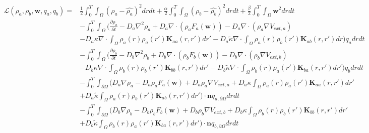 \documentclass[11pt, a4paper]{article}
\theoremstyle{definition}
\newcommand{\adja}{q_a}
\newcommand{\adjb}{q_b}
\newcommand{\adjaB}{q_{a,\partial \Omega}}
\newcommand{\adjbB}{q_{b,\partial \Omega}}
\newcommand{\ra}{\rho_a}
\newcommand{\rb}{\rho_b}
\newcommand{\w}{\mathbf{w}}
\newcommand{\n}{\mathbf{n}}
\newcommand{\K}{\mathbf{K}}
\begin{document}
	\begin{align*}
	\mathcal{L}(\ra,\rb, \w, \adja, \adjb) =& \frac{1}{2}\int_0^T \int_\Omega ( \ra - \widehat{\ra})^2 dr dt + \frac{\alpha}{2}\int_0^T \int_\Omega ( \rb - \widehat{\rb})^2 dr dt + \frac{\beta}{2}\int_0^T \int_\Omega \w^2 dr dt\\
	& - \int_0^T \int_\Omega \bigg(\frac{\partial \ra}{\partial t} - D_a\nabla^2 \ra + D_a\nabla \cdot(\ra F_a(\w)) - D_a \nabla \cdot (\ra \nabla V_{ext,a})\\
	& - D_a\kappa \nabla \cdot \int_\Omega \ra(r) \ra (r') \K_{aa}(r,r')dr' - D_a\tilde{\kappa} \nabla \cdot \int_\Omega \ra(r) \rb (r') \K_{ab}(r,r')dr\bigg)\adja dr dt \\
	& - \int_0^T \int_\Omega \bigg(
	\frac{\partial \rb}{\partial t} - D_b\nabla^2 \rb + D_b\nabla \cdot(\rb F_b(\w)) - D_b \nabla \cdot (\rb \nabla V_{ext,b}) \\
	&- D_b\kappa \nabla \cdot \int_\Omega \rb(r) \rb (r') \K_{bb}(r,r')dr'
	-  D_b\tilde{\kappa} \nabla \cdot \int_\Omega \rb(r) \ra (r')\K_{ba}(r,r')dr'\bigg) \adjb dr dt\\
	&- \int_0^T \int_{\partial \Omega} \bigg( D_a \nabla \ra - D_a \ra F_a(\w) + D_a \ra \nabla V_{ext,a} + D_a\kappa \int_\Omega \ra(r) \ra (r') \K_{aa}(r,r')dr' \\
	&+  D_a\tilde{\kappa} \int_\Omega \ra(r) \rb (r') \K_{ab}(r,r')dr' \bigg) \cdot \n \adjaB dr dt\\
	& - \int_0^T \int_{\partial \Omega} \bigg( D_b \nabla \rb - D_b \rb F_b(\w) + D_b \rb \nabla V_{ext,b} + D_b\kappa \int_\Omega \rb(r) \rb (r')\K_{bb}(r,r')dr' \\
	&+  D_b\tilde{\kappa} \int_\Omega \rb(r) \ra (r') \K_{ba}(r,r')dr' \bigg) \cdot \n \adjbB dr dt
	\end{align*}
\end{document}
